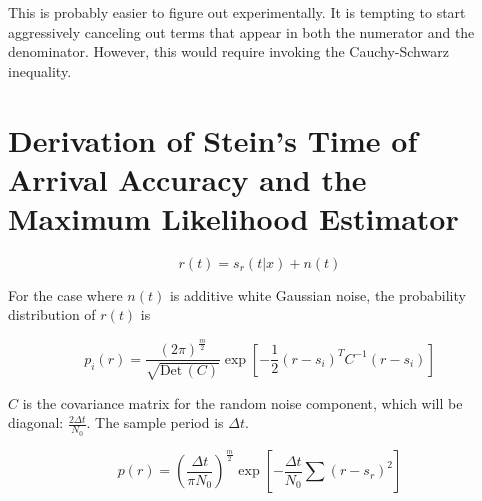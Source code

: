 \documentclass[11pt]{article}
\def\Det{{\textrm{Det}}\,}
\begin{document}







This is probably easier to figure out experimentally. It is tempting to start aggressively canceling out terms that appear in both the numerator and the denominator. However, this would require invoking the Cauchy-Schwarz inequality.


\section{Derivation of Stein's Time of Arrival Accuracy and the Maximum Likelihood Estimator}

\begin{equation}
r(t) = s_r(t|x) + n(t)
\end{equation}

For the case where $n(t)$ is additive white Gaussian noise, the probability distribution of $r(t)$ is

\begin{equation}
p_i(r)
=
\frac{(2\pi)^\frac{m}{2}}{\sqrt{\Det(C)}}
\exp \left[ -\frac{1}{2} (r-s_i)^T C^{-1} (r-s_i) \right]
\end{equation}

$C$ is the covariance matrix for the random noise component, which will be diagonal: $\frac{2\Delta t}{N_0}$.  The sample period is $\Delta t$.

\begin{equation}
p(r)
=
\left( \frac{\Delta t}{\pi N_0} \right)^\frac{m}{2}
\exp \left[ -\frac{\Delta t}{N_0} \sum (r - s_r)^2 \right]
\end{equation}
\end{document}
